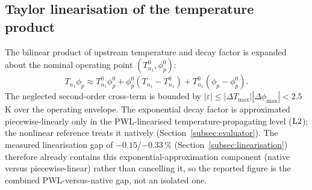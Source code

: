 \subsection{Taylor linearisation of the temperature product}
\label{app:taylor_derivation}

The bilinear product of upstream temperature and decay factor is expanded about the
nominal operating point $(T_{n_1}^0, \phi_p^0)$:
\begin{equation}
  T_{n_1} \phi_p \approx T_{n_1}^0 \phi_p^0
  + \phi_p^0 (T_{n_1} - T_{n_1}^0)
  + T_{n_1}^0 (\phi_p - \phi_p^0).
\end{equation}
The neglected second-order cross-term is bounded by
$|\varepsilon| \leq |\Delta T_{\max}| |\Delta\phi_{\max}| < 2.5$\,K over the operating
envelope. The exponential decay factor is approximated piecewise-linearly only in the
PWL-linearised temperature-propagating level ($\mathrm{L2}$); the nonlinear reference treats it
natively (Section~\ref{subsec:evaluator}). The measured linearisation gap of
$-0.15$/$-0.33$\,\% (Section~\ref{subsec:linearisation}) therefore already contains this
exponential-approximation component (native versus piecewise-linear) rather than cancelling
it, so the reported figure is the combined PWL-versus-native gap, not an isolated one.
